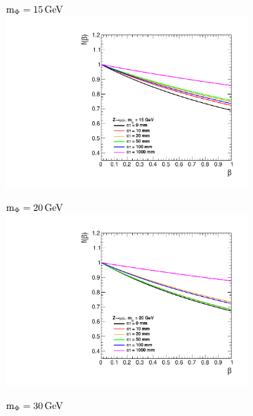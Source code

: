\begin{figure}[htb!]
	\centering
	\captionsetup[subfigure]{justification=centering}
	\begin{subfigure}{0.3\linewidth}
		\centering
		$\text{m}_\Phi=15\,\text{Ge\hspace{-.08em}V}$
		\includegraphics[width=\linewidth]{figs/05_analysis/BR_Z_MU_15.pdf}
	\end{subfigure}
	\begin{subfigure}{0.3\linewidth}
		\centering
		$\text{m}_\Phi=20\,\text{Ge\hspace{-.08em}V}$
		\includegraphics[width=\linewidth]{figs/05_analysis/BR_Z_MU_20.pdf}
	\end{subfigure}
	\begin{subfigure}{0.3\linewidth}
		\centering
		$\text{m}_\Phi=30\,\text{Ge\hspace{-.08em}V}$

\end{subfigure}
\end{figure}

